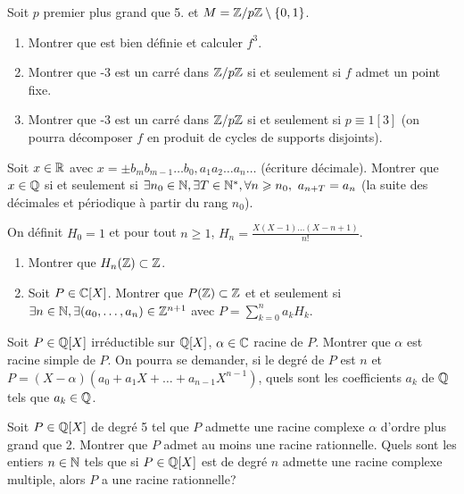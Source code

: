 \begin{exercise}
	Soit $p$ premier plus grand que 5. et $M=\mathbb{Z}/p\mathbb{Z}\setminus\{0,1\}$.
	\begin{enumerate}
		\item
		Montrer que  est bien définie et calculer
		$f^{3}$.
		\item
		Montrer que -3 est un carré dans $\mathbb{Z}/p\mathbb{Z}$ si et seulement si $f$ admet un
		point fixe.
		\item
		Montrer que -3 est un carré dans $\mathbb{Z}/p\mathbb{Z}$ si et seulement si $p\equiv
		1[3]$ (on pourra décomposer $f$ en produit de cycles de supports
		disjoints).
	\end{enumerate}
\end{exercise}

\begin{exercise}
	Soit $x\in\mathbb{R}$ avec $x=\pm b_{m}b_{m-1}\dots b_{0},a_{1}a_{2}\dots a_{n}\dots$
	(écriture décimale). Montrer que $x\in\mathbb{Q}$ si et seulement si $\exists
	n_{0}\in\mathbb{N},\exists T\in\mathbb{N}^{*},\forall n\geqslant n_{0},~a_{n+T}=a_{n}$ (la
	suite des décimales et périodique à partir du rang $n_{0}$).
\end{exercise}

\begin{exercise}
	On définit $H_{0}=1$ et pour tout $n\geqslant1$,
	$H_{n}=\frac{X(X-1)\dots(X-n+1)}{n!}$.
	\begin{enumerate}
		\item
		Montrer que $H_{n}(\mathbb{Z})\subset\mathbb{Z}$.
		\item
		Soit $P\in\mathbb{C}[X]$. Montrer que $P(\mathbb{Z})\subset\mathbb{Z}$ et et seulement si $\exists
		n\in\mathbb{N},\exists(a_{0},\dots,a_{n})\in\mathbb{Z}^{n+1}$ avec
		$P=\sum_{k=0}^{n}a_{k}H_{k}$.
	\end{enumerate}
\end{exercise}

\begin{exercise}
	Soit $P\in\mathbb{Q}[X]$ irréductible sur $\mathbb{Q}[X]$, $\alpha\in\mathbb{C}$ racine de $P$.
	Montrer que $\alpha$ est racine simple de $P$. On pourra se demander, si le
	degré de $P$ est $n$ et $P=(X-\alpha)(a_{0}+a_{1}X+\dots+a_{n-1}X^{n-1})$,
	quels sont les coefficients $a_{k}$ de $\mathbb{Q}$ tels que $a_{k}\in\mathbb{Q}$.
\end{exercise}

\begin{exercise}
	Soit $P\in\mathbb{Q}[X]$ de degré 5 tel que $P$ admette une racine complexe $\alpha$
	d'ordre plus grand que 2. Montrer que $P$ admet au moins une racine
	rationnelle. Quels sont les entiers $n\in\mathbb{N}$ tels que si $P\in\mathbb{Q}[X]$ est de
	degré $n$ admette une racine complexe multiple, alors $P$ a une racine
	rationnelle?
\end{exercise}

